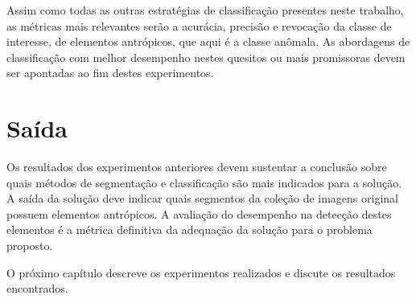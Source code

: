 Assim como todas as outras estratégias de classificação presentes neste trabalho, as métricas mais relevantes serão a acurácia, precisão e revocação da classe de interesse, de elementos antrópicos, que aqui é a classe anômala. As abordagens de classificação com melhor desempenho nestes quesitos ou mais promissoras devem ser apontadas ao fim destes experimentos.

\section{Saída}

 Os resultados dos experimentos anteriores devem sustentar a conclusão sobre quais métodos de segmentação e classificação são mais indicados para a solução. A saída da solução deve indicar quais segmentos da coleção de imagens original possuem elementos antrópicos. A avaliação do desempenho na detecção destes elementos é a métrica definitiva da adequação da solução para o problema proposto.

O próximo capítulo descreve os experimentos realizados e discute os resultados encontrados.